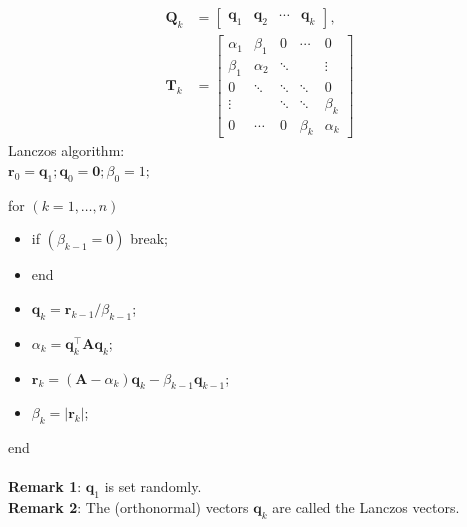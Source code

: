 \documentclass[11pt]{book}
\begin{document}
$$
\begin{aligned}
\mathbf{Q}_{k} & =\left[\begin{array}{llll}
\mathbf{q}_{1} & \mathbf{q}_{2} & \cdots & \mathbf{q}_{k}
\end{array}\right], \\
\mathbf{T}_{k} & =\left[\begin{array}{ccccc}
\alpha_{1} & \beta_{1} & 0 & \cdots & 0 \\
\beta_{1} & \alpha_{2} & \ddots & & \vdots \\
0 & \ddots & \ddots & \ddots & 0 \\
\vdots & & \ddots & \ddots & \beta_{k} \\
0 & \cdots & 0 & \beta_{k} & \alpha_{k}
\end{array}\right]
\end{aligned}
$$
Lanczos algorithm: \\
$\mathbf{r}_{0}=\mathbf{q}_{1} ; \mathbf{q}_{0}=\mathbf{0} ; \beta_{0}=1 ;$

for $(k=1, \ldots, n)$

\begin{itemize}
  \item if $\left(\beta_{k-1}=0\right)$
        break;
  \item end

  \item $\mathbf{q}_{k}=\mathbf{r}_{k-1} / \beta_{k-1}$;

  \item $\alpha_{k}=\mathbf{q}_{k}^{\top} \mathbf{A} \mathbf{q}_{k}$;

  \item $\mathbf{r}_{k}=\left(\mathbf{A}-\alpha_{k}\right) \mathbf{q}_{k}-\beta_{k-1} \mathbf{q}_{k-1}$;

  \item $\beta_{k}=\left|\mathbf{r}_{k}\right|$;

\end{itemize}
end\\ \\ 
\textbf{Remark 1}: $\mathbf{q}_{1}$ is set randomly.\\
\textbf{Remark 2}: The (orthonormal) vectors $\mathbf{q}_{k}$ are called the Lanczos vectors.
\end{document}
